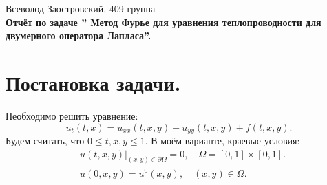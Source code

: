 \documentclass[14pt,a4paper]{extarticle}
\newcommand{\1}{\mathbbm{1}}
\begin{document}
\begin{center}
    {Всеволод Заостровский, 409 группа}\\
    {\bfseries Отчёт по задаче '' Метод Фурье для уравнения теплопроводности для двумерного оператора Лапласа''.\\}
    \vspace{1cm}
\end{center}

\tableofcontents

\section{Постановка задачи.} \label{diffeq1}
Необходимо решить уравнение:
\begin{equation*} 
    u_t(t, x) = u_{xx}(t, x, y) + u_{yy}(t, x, y) + f(t, x, y).
\end{equation*}
Будем считать, что $0 \leq t,x,y \leq 1$. В моём варианте, краевые условия:
\begin{align*} 
    &u(t, x, y) \big| _{(x ,y) \in \partial \Omega} = 0, \quad \Omega = [0,1] \times [0,1]. \\
    &u(0, x, y) = u^0(x, y), \quad (x, y) \in \Omega. 
\end{align*}


\end{document}
